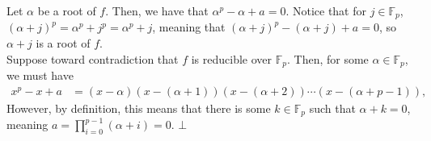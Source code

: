 \documentclass[11pt]{extarticle}
\begin{document}
  Let $\alpha$ be a root of $f$. Then, we have that $\alpha^p - \alpha + a = 0$. Notice that for $j\in \mathbb{F}_p$, $(\alpha + j)^{p} = \alpha^p + j^p = \alpha^p + j$, meaning that $(\alpha + j)^{p} - (\alpha + j) + a = 0$, so $\alpha + j$ is a root of $f$.\\

  Suppose toward contradiction that $f$ is reducible over $\mathbb{F}_p$. Then, for some $\alpha \in \mathbb{F}_p$, we must have
  \begin{align*}
    x^p - x + a &= \left(x-\alpha\right)\left(x-(\alpha + 1)\right)\left(x-(\alpha + 2)\right)\cdots\left(x-(\alpha + p - 1)\right),
  \end{align*}
  However, by definition, this means that there is some $k\in \mathbb{F}_{p}$ such that $\alpha + k = 0$, meaning $ a = \prod_{i=0}^{p-1}(\alpha + i) = 0$. $\bot$
\end{document}
